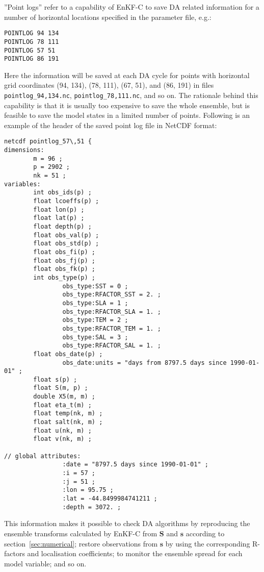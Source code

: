\documentclass[11pt]{report}
\newcommand{\mb} {\mathbf}
\begin{document}
''Point logs'' refer to a capability of EnKF-C to save DA related information for a number of horizontal locations specified in the parameter file, e.g.:
\begin{Verbatim}[frame=single,fontsize=\footnotesize]
POINTLOG 94 134
POINTLOG 78 111
POINTLOG 57 51
POINTLOG 86 191
\end{Verbatim}
Here the information will be saved at each DA cycle for points with horizontal grid coordinates (94, 134), (78, 111), (67, 51), and (86, 191) in files \verb|pointlog_94,134.nc|, \verb|pointlog_78,111.nc|, and so on.
The rationale behind this capability is that it is usually too expensive to save the whole ensemble, but is feasible to save the model states in a limited number of points.
Following is an example of the header of the saved point log file in NetCDF format:
\begin{Verbatim}[frame=single,fontsize=\footnotesize]
netcdf pointlog_57\,51 {
dimensions:
        m = 96 ;
        p = 2902 ;
        nk = 51 ;
variables:
        int obs_ids(p) ;
        float lcoeffs(p) ;
        float lon(p) ;
        float lat(p) ;
        float depth(p) ;
        float obs_val(p) ;
        float obs_std(p) ;
        float obs_fi(p) ;
        float obs_fj(p) ;
        float obs_fk(p) ;
        int obs_type(p) ;
                obs_type:SST = 0 ;
                obs_type:RFACTOR_SST = 2. ;
                obs_type:SLA = 1 ;
                obs_type:RFACTOR_SLA = 1. ;
                obs_type:TEM = 2 ;
                obs_type:RFACTOR_TEM = 1. ;
                obs_type:SAL = 3 ;
                obs_type:RFACTOR_SAL = 1. ;
        float obs_date(p) ;
                obs_date:units = "days from 8797.5 days since 1990-01-01" ;
        float s(p) ;
        float S(m, p) ;
        double X5(m, m) ;
        float eta_t(m) ;
        float temp(nk, m) ;
        float salt(nk, m) ;
        float u(nk, m) ;
        float v(nk, m) ;

// global attributes:
                :date = "8797.5 days since 1990-01-01" ;
                :i = 57 ;
                :j = 51 ;
                :lon = 95.75 ;
                :lat = -44.8499984741211 ;
                :depth = 3072. ;
\end{Verbatim}
This information makes it possible to check DA algorithms by reproducing the ensemble transforms calculated by EnKF-C from $\mb S$ and $\mb s$ according to section~\ref{sec:numerical}; restore observations from $\mb s$ by using the corresponding R-factors and localisation coefficients; to monitor the ensemble spread for each model variable; and so on.
\end{document}

